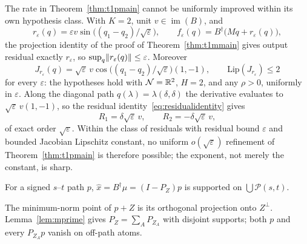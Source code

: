 \begin{rmk}\label{rmk:sqrttight}
The rate in Theorem~\ref{thm:t1pmain} cannot be uniformly improved within
its own hypothesis class. With $K=2$, unit $v\in\operatorname{im}(B)$, and
\[
r_\varepsilon(q)=\varepsilon v\sin\!\big((q_1-q_2)/\sqrt\varepsilon\big),
\qquad
f_\varepsilon(q)=B^\dagger\big(Mq+r_\varepsilon(q)\big),
\]
the projection identity of the proof of Theorem~\ref{thm:t1mmain} gives
output residual exactly $r_\varepsilon$, so
$\sup_q\lVert r_\varepsilon(q) \rVert\le\varepsilon$. Moreover
\[
J_{r_\varepsilon}(q)
=\sqrt\varepsilon\,v\cos\!\big((q_1-q_2)/\sqrt\varepsilon\big)(1,-1),
\qquad
\mathrm{Lip}(J_{r_\varepsilon})\le2
\]
for every $\varepsilon$: the hypotheses hold with $\mathcal N=\mathbb{R}^2$,
$H=2$, and any $\rho>0$, uniformly in $\varepsilon$. Along the diagonal
path $q(\lambda)=\lambda(\delta,\delta)$ the derivative evaluates to
$\sqrt\varepsilon\,v(1,-1)$, so the residual
identity~\eqref{eq:residualidentity} gives
\[
R_1=\delta\sqrt\varepsilon\,v,\qquad R_2=-\delta\sqrt\varepsilon\,v,
\]
of exact order $\sqrt\varepsilon$. Within the class of residuals with
residual bound $\varepsilon$ and bounded Jacobian Lipschitz constant, no
uniform $o(\sqrt\varepsilon)$ refinement of Theorem~\ref{thm:t1pmain} is
therefore possible; the exponent, not merely the constant, is sharp.
\end{rmk}

\begin{lemma}\label{lem:s}
For a signed $s$--$t$ path $p$, $\hat x=B^\dagger\mu=(I-P_Z)p$
is supported on $\bigcup\mathcal P(s,t)$.
\end{lemma}
\begin{pf}
The minimum-norm point of $p+Z$ is its orthogonal projection onto
$Z^\perp$. Lemma~\ref{lem:mprime} gives
$P_Z=\sum_A P_{Z_A}$ with disjoint supports; both $p$ and every
$P_{Z_A}p$ vanish on off-path atoms.
\end{pf}

